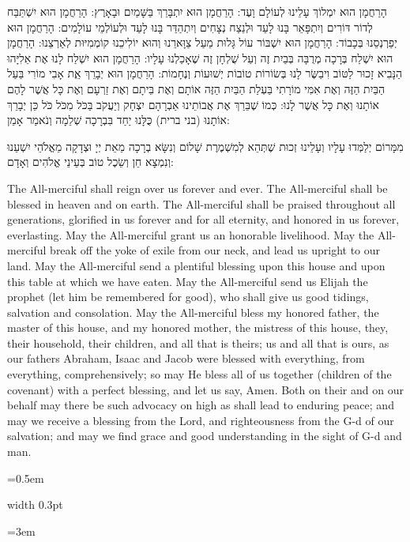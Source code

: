 \documentclass[11pt, openany]{book}
\newlength{\bidiHebWidth}
\newlength{\bidiEngWidth}
\newenvironment{bilingual}{%
  \par\vspace{4pt}%
}{%
  \noindent
  \begin{minipage}[t]{\bidiEngWidth}
    \setstretch{1.4}\emergencystretch=0.5em\normalsize
    \usebox{\bidiEngBox}
  \end{minipage}%
  \hfill
  {\color{sedergold}\vrule width 0.3pt}%
  \hfill
  \begin{minipage}[t]{\bidiHebWidth}
    \begingroup\hebrewfont\TeXXeTstate=1\beginR
    \large\setstretch{1.4}\emergencystretch=3em\tolerance=9999\parindent=0pt\relax
    \usebox{\bidiHebBox}
    \endR\endgroup
  \end{minipage}%
  \par\vspace{2pt}%
}
\newenvironment{hebrewcol}{%
  \begin{lrbox}{\bidiHebBox}\begin{minipage}{\bidiHebWidth}%
}{%
  \end{minipage}\end{lrbox}%
}
\newenvironment{englishcol}{%
  \begin{lrbox}{\bidiEngBox}\begin{minipage}{\bidiEngWidth}%
}{%
  \end{minipage}\end{lrbox}%
}
\begin{document}
\begin{bilingual}
\begin{hebrewcol}
הָרַחֲמָן הוּא יִמְלוֹךְ עָלֵינוּ לְעוֹלָם וָעֶד: הָרַחֲמָן הוּא יִתְבָּרֵךְ בַּשָּׁמַיִם וּבָאָרֶץ: הָרַחֲמָן הוּא יִשְׁתַּבַּח לְדוֹר דּוֹרִים וְיִתְפָּאֵר בָּנוּ לָעַד וּלְנֵצַח נְצָחִים וְיִתְהַדַּר בָּנוּ לָעַד וּלְעוֹלְמֵי עוֹלָמִים: הָרַחֲמָן הוּא יְפַרְנְסֵנוּ בְּכָבוֹד: הָרַחֲמָן הוּא יִשְׁבּוֹר עוֹל גָּלוּת מֵעַל צַוָּארֵנוּ וְהוּא יוֹלִיכֵנוּ קוֹמְמִיּוּת לְאַרְצֵנוּ: הָרַחֲמָן הוּא יִשְׁלַח בְּרָכָה מְרֻבָּה בְּבַיִת זֶה וְעַל שֻׁלְחָן זֶה שֶׁאָכַלְנוּ עָלָיו: הָרַחֲמָן הוּא יִשְׁלַח לָנוּ אֶת אֵלִיָּהוּ הַנָּבִיא זָכוּר לַטּוֹב וִיבַשֶּׂר לָנוּ בְּשׂוֹרוֹת טוֹבוֹת יְשׁוּעוֹת וְנֶחָמוֹת: הָרַחֲמָן הוּא יְבָרֵךְ אֵֶת אָבִי מוֹרִי בַּעַל הַבַּיִת הַזֶּה וְאֶת אִמִּי מוֹרָתִי בַּעְלַת הַבַּיִת הַזֶּה אוֹתָם וְאֶת בֵּיתָם וְאֶת זַרְעָם וְאֶת כָּל אֲשֶׁר לָהֶם אוֹתָנוּ וְאֶת כָּל אֲשֶׁר לָנוּ: כְּמוֹ שֶׁבֵּרַךְ אֶת אֲבוֹתֵינוּ אַבְרָהָם יִצְחָק וְיַעֲקֹב בַּכֹּל מִכֹּל כֹּל כֵּן יְבָרֵךְ אוֹתָנוּ (בני ברית) כֻּלָּנוּ יַחַד בִּבְרָכָה שְׁלֵמָה וְנֹאמַר אָמֵן:

מִמָּרוֹם יְלַמְּדוּ עָלָיו וְעָלֵינוּ זְכוּת שֶׁתְּהֵא לְמִשְׁמֶרֶת שָׁלוֹם וְנִשָּׂא בְרָכָה מֵאֵת יְיָ וּצְדָקָה מֵאֱלֹהֵי יִשְׁעֵנוּ וְנִמְצָא חֵן וְשֵׂכֶל טוֹב בְּעֵינֵי אֱלֹהִים וְאָדָם:
\end{hebrewcol}
\begin{englishcol}
The All-merciful shall reign over us forever and ever. The All-merciful shall be blessed in heaven and on earth. The All-merciful shall be praised throughout all generations, glorified in us forever and for all eternity, and honored in us forever, everlasting. May the All-merciful grant us an honorable livelihood. May the All-merciful break off the yoke of exile from our neck, and lead us upright to our land. May the All-merciful send a plentiful blessing upon this house and upon this table at which we have eaten. May the All-merciful send us Elijah the prophet (let him be remembered for good), who shall give us good tidings, salvation and consolation. May the All-merciful bless my honored father, the master of this house, and my honored mother, the mistress of this house, they, their household, their children, and all that is theirs; us and all that is ours, as our fathers Abraham, Isaac and Jacob were blessed with everything, from everything, comprehensively; so may He bless all of us together (children of the covenant) with a perfect blessing, and let us say, Amen. Both on their and on our behalf may there be such advocacy on high as shall lead to enduring peace; and may we receive a blessing from the Lord, and righteousness from the G-d of our salvation; and may we find grace and good understanding in the sight of G-d and man.
\end{englishcol}
\end{bilingual}
\end{document}
